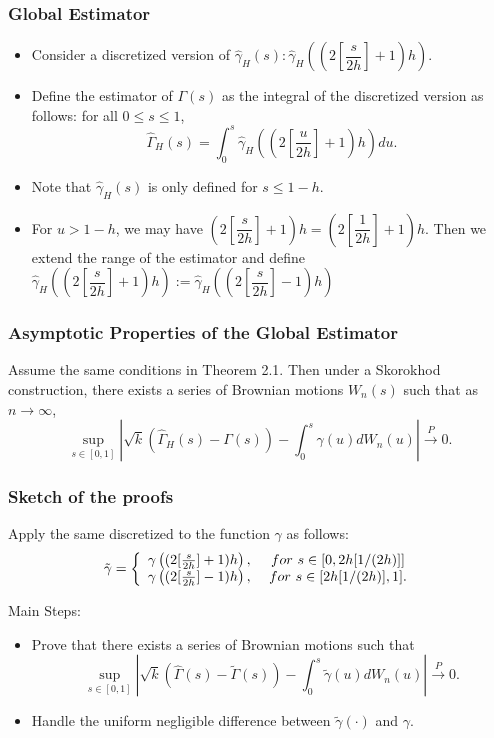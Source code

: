 \documentclass{beamer}
\newcommand{\suit}[1]{\left(#1\right)}
\newcommand{\abs}[1]{\left\vert#1\right\vert}
\begin{document}
\begin{frame}
    \frametitle{Global Estimator}

    \begin{itemize}
        \item      Consider a discretized version of $\hat{\gamma}_H(s): \hat{\gamma}_H\suit{(2[\dfrac{s}{2h}]+1)h}$.
        \smallskip
        \item      Define the estimator of $\Gamma(s)$ as the integral of the discretized version as follows: for all $0\le s\le 1$,
        $$
        \hat{\Gamma}_{H}(s)=\int_{0}^{s} \hat{\gamma}_{H}\left(\left(2\left[\frac{u}{2 h}\right]+1\right) h\right) d u.
        $$
        \smallskip
        \item Note that $\hat{\gamma}_H(s)$ is only defined for $s\le 1-h$.
        \smallskip
        \item For $u>1-h$, we may have $(2[\dfrac{s}{2h}]+1)h=(2[\dfrac{1}{2h}]+1)h$. Then we extend the range of the estimator and define $\hat{\gamma}_H((2[\dfrac{s}{2h}]+1)h):=\hat{\gamma}_H((2[\dfrac{s}{2h}]-1)h)$
    \end{itemize}


\end{frame}


\begin{frame}
    \frametitle{Asymptotic Properties of the Global Estimator}

    \begin{theorem}[2.2]
        Assume the same conditions in Theorem 2.1. Then under a Skorokhod  construction, there exists a series of Brownian motions $W_n(s)$ such that as $n \to \infty$,
$$
\sup _{s \in[0,1]}\left|\sqrt{k}\left(\hat{\Gamma}_{H}(s)-\Gamma(s)\right)-\int_{0}^{s} \gamma(u) d W_{n}(u)\right| \stackrel{P}{\rightarrow} 0.
$$
    \end{theorem}
    

\end{frame}


\begin{frame}
    \frametitle{Sketch of the proofs}
Apply the same discretized to the function $\gamma$ as follows:
$$
\tilde{\gamma} =\left\{ \begin{array}[]{cc}
    \gamma\suit{(2[\frac{s}{2h}]+1)h}, & \ for \ s\in [0,2h[1/(2h)]]\\
    \gamma\suit{(2[\frac{s}{2h}]-1)h}, & \ for \ s\in [2h[1/(2h)],1].
\end{array}\right.
$$
\bigskip

Main Steps:
\begin{itemize}
    \item Prove that there exists a series of Brownian motions such that 
    $$
\sup_{s\in [0,1]} \abs{\sqrt{k}(\hat{\Gamma}(s)-\tilde{\Gamma}(s))-\int_{0}^s \tilde{\gamma}(u)dW_n(u)}\stackrel{P}{\to} 0.
    $$
    \item Handle the uniform negligible difference between $\tilde{\gamma}(\cdot)$ and $\gamma$.
\end{itemize}

\end{frame}
\end{document}
